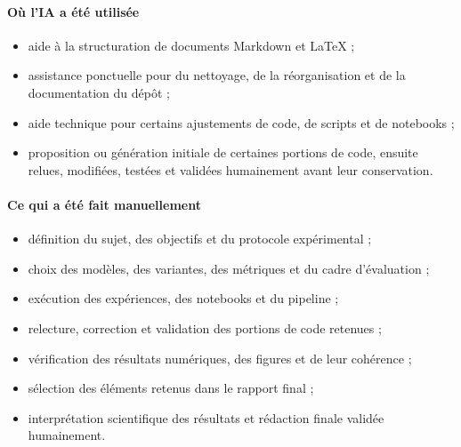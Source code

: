 \paragraph{Où l'IA a été utilisée}
\begin{itemize}
    \item aide à la structuration de documents Markdown et LaTeX ;
    \item assistance ponctuelle pour du nettoyage, de la réorganisation et de la documentation du dépôt ;
    \item aide technique pour certains ajustements de code, de scripts et de notebooks ;
    \item proposition ou génération initiale de certaines portions de code, ensuite relues, modifiées, testées et validées humainement avant leur conservation.
\end{itemize}

\paragraph{Ce qui a été fait manuellement}
\begin{itemize}
    \item définition du sujet, des objectifs et du protocole expérimental ;
    \item choix des modèles, des variantes, des métriques et du cadre d'évaluation ;
    \item exécution des expériences, des notebooks et du pipeline ;
    \item relecture, correction et validation des portions de code retenues ;
    \item vérification des résultats numériques, des figures et de leur cohérence ;
    \item sélection des éléments retenus dans le rapport final ;
    \item interprétation scientifique des résultats et rédaction finale validée humainement.
\end{itemize}

